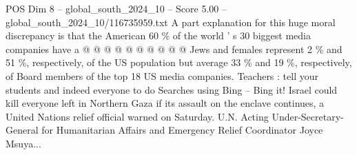 \begin{textsample}{POS Dim 8 – global\_south\_2024\_10 – Score 5.00 – global\_south\_2024\_10/116735959.txt}
A part explanation for this huge moral discrepancy is that the American 60 \% of the world ' s 30 biggest media companies have a @ @ @ @ @ @ @ @ @ @ Jews and females represent 2 \% and 51 \%, respectively, of the US population but average 33 \% and 19 \%, respectively, of Board members of the top 18 US media companies.
Teachers : tell your students and indeed everyone to do Searches using Bing -- Bing it!
Israel could kill everyone left in Northern Gaza if its assault on the enclave continues, a United Nations relief official warned on Saturday.
U.N.
Acting Under-Secretary-General for Humanitarian Affairs and Emergency Relief Coordinator Joyce Msuya...

\end{textsample}
